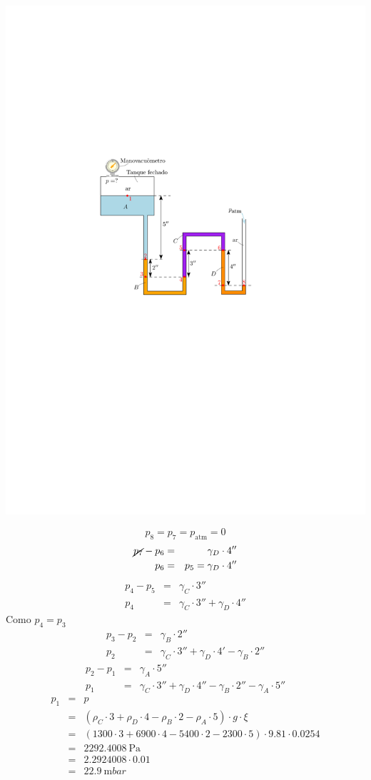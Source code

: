 \documentclass[
	a4paper,
	12pt,
	brazilian
]{article}
\begin{document}
	\begin{center}
		\includegraphics[width=.7\linewidth]{assets/images/pontos_5}
	\end{center}
	\begin{equation}
		p_{8}=p_{7}=p_{\textrm{atm}}=0
	\end{equation}
	\begin{eqnarray}
		\cancel{p_{7}}-p_{6}&=&\gamma_{D}\cdot 4''\\
		p_{6}&=&p_{5}=\gamma_{D}\cdot 4''
	\end{eqnarray}
	\begin{eqnarray}
		p_{4}-p_{5}&=&\gamma_{C}\cdot 3''\\
		p_{4}&=&\gamma_{C}\cdot 3''+\gamma_{D}\cdot 4''
	\end{eqnarray}
	Como $p_{4}=p_{3}$
	\begin{eqnarray}
		p_{3}-p_{2}&=&\gamma_{B}\cdot 2''\\
		p_{2}&=&\gamma_{C}\cdot 3''+\gamma_{D}\cdot 4'-\gamma_{B}\cdot 2''
	\end{eqnarray}
	\begin{eqnarray}
		p_{2}-p_{1}&=&\gamma_{A}\cdot 5''\\
		p_{1}&=&\gamma_{C}\cdot 3''+\gamma_{D}\cdot 4''-\gamma_{B}\cdot 2''-\gamma_{A}\cdot 5''
	\end{eqnarray}
	\begin{eqnarray}
		p_{1}&=&p\\
		&=&(\rho_{C}\cdot 3+\rho_{D}\cdot 4-\rho_{B}\cdot 2-\rho_{A}\cdot 5)\cdot g\cdot\xi\\
		&=&(1300\cdot 3+6900\cdot 4-5400\cdot 2-2300\cdot 5)\cdot 9.81\cdot 0.0254\\
		&=&\SI{2292.4008}{\pascal}\\
		&=&2.2924008\cdot 0.01\\
		&=&\SI{22.9}{\milli bar}
	\end{eqnarray}
\end{document}
